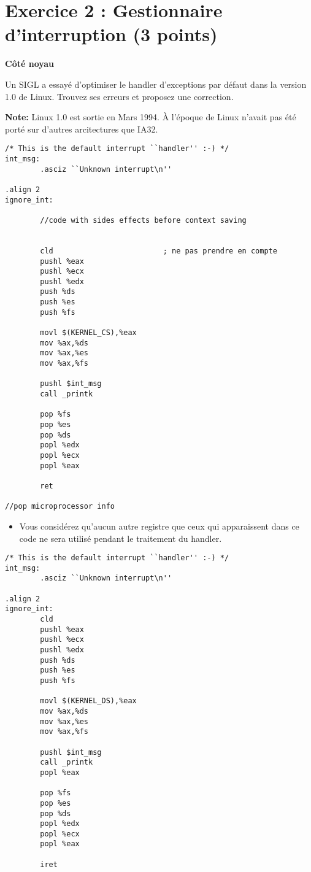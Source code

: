 \newpage

\section*{Exercice 2 : Gestionnaire d'interruption (3 points)}

{\bf C\^ot\'e noyau}

Un SIGL a essay\'e d'optimiser le handler d'exceptions par d\'efaut dans la version 1.0 de Linux. Trouvez ses erreurs et proposez une correction.

{\bf Note:} Linux 1.0 est sortie en Mars 1994. \`A l'\'epoque de Linux n'avait pas \'et\'e port\'e sur d'autres arcitectures que IA32.

\begin{verbatim}
/* This is the default interrupt ``handler'' :-) */
int_msg:
        .asciz ``Unknown interrupt\n''

.align 2
ignore_int:

        //code with sides effects before context saving
	

        cld                         ; ne pas prendre en compte
        pushl %eax
        pushl %ecx
        pushl %edx
        push %ds
        push %es
        push %fs

        movl $(KERNEL_CS),%eax
        mov %ax,%ds
        mov %ax,%es
        mov %ax,%fs

        pushl $int_msg
        call _printk

        pop %fs
        pop %es
        pop %ds
        popl %edx
        popl %ecx
        popl %eax

        ret

//pop microprocessor info
\end{verbatim}

\begin{itemize}
\item Vous consid\'erez qu'aucun autre registre que ceux qui apparaissent dans ce code ne sera utilis\'e pendant le traitement du handler.
\end{itemize}

\begin{correction}
\begin{verbatim}
/* This is the default interrupt ``handler'' :-) */
int_msg:
        .asciz ``Unknown interrupt\n''

.align 2
ignore_int:
        cld
        pushl %eax
        pushl %ecx
        pushl %edx
        push %ds
        push %es
        push %fs

        movl $(KERNEL_DS),%eax
        mov %ax,%ds
        mov %ax,%es
        mov %ax,%fs

        pushl $int_msg
        call _printk
        popl %eax

        pop %fs
        pop %es
        pop %ds
        popl %edx
        popl %ecx
        popl %eax

        iret
\end{verbatim}
\end{correction}




